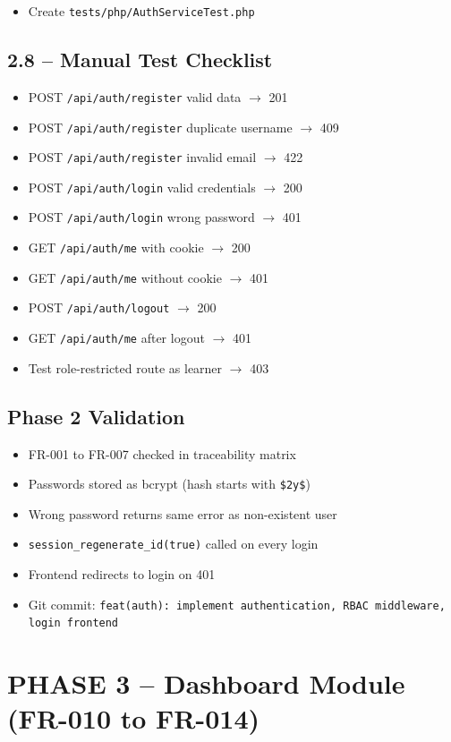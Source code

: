 \documentclass[11pt,a4paper]{article}
\newcommand{\undone}{\textcolor{helixgray}{\texttt{[ ] }}}
\newcommand{\filepath}[1]{\texttt{\small#1}}
\newcommand{\task}[2]{\item[#1] #2}
\begin{document}
\begin{itemize}
    \task{\undone}{Create \filepath{tests/php/AuthServiceTest.php}}
\end{itemize}

\subsection{2.8 -- Manual Test Checklist}

\begin{itemize}
    \task{\undone}{POST \texttt{/api/auth/register} valid data $\rightarrow$ 201}
    \task{\undone}{POST \texttt{/api/auth/register} duplicate username $\rightarrow$ 409}
    \task{\undone}{POST \texttt{/api/auth/register} invalid email $\rightarrow$ 422}
    \task{\undone}{POST \texttt{/api/auth/login} valid credentials $\rightarrow$ 200}
    \task{\undone}{POST \texttt{/api/auth/login} wrong password $\rightarrow$ 401}
    \task{\undone}{GET \texttt{/api/auth/me} with cookie $\rightarrow$ 200}
    \task{\undone}{GET \texttt{/api/auth/me} without cookie $\rightarrow$ 401}
    \task{\undone}{POST \texttt{/api/auth/logout} $\rightarrow$ 200}
    \task{\undone}{GET \texttt{/api/auth/me} after logout $\rightarrow$ 401}
    \task{\undone}{Test role-restricted route as learner $\rightarrow$ 403}
\end{itemize}

\subsection{Phase 2 Validation}

\begin{itemize}
    \task{\undone}{FR-001 to FR-007 checked in traceability matrix}
    \task{\undone}{Passwords stored as bcrypt (hash starts with \texttt{\$2y\$})}
    \task{\undone}{Wrong password returns same error as non-existent user}
    \task{\undone}{\texttt{session\_regenerate\_id(true)} called on every login}
    \task{\undone}{Frontend redirects to login on 401}
    \task{\undone}{Git commit: \texttt{feat(auth): implement authentication, RBAC middleware, login frontend}}
\end{itemize}

\section{PHASE 3 -- Dashboard Module (FR-010 to FR-014)}
\end{document}
